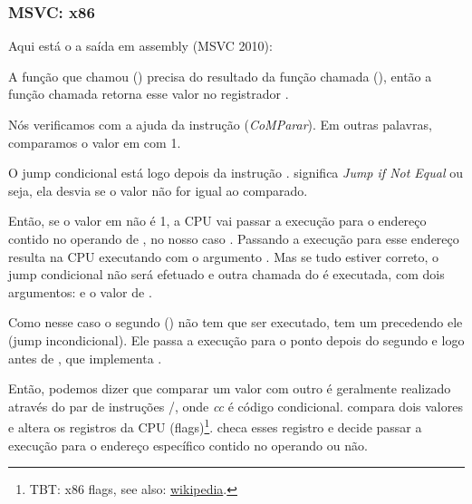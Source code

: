 \subsubsection{MSVC: x86}

Aqui está o a saída em assembly (MSVC 2010):



A função que chamou (\main) precisa do resultado da função chamada (\scanf),
então a função chamada retorna esse valor no registrador \EAX.

Nós verificamos com a ajuda da instrução  (\emph{CoMParar}). Em outras palavras, comparamos o valor em \EAX com 1.

O jump condicional \JNE está logo depois da instrução \CMP. \JNE significa \emph{Jump if Not Equal} ou seja, ela desvia se o valor não for igual ao comparado.

Então, se o valor em \EAX não é 1, a \ac{CPU} vai passar a execução para o endereço contido no operando de \JNE, no nosso caso .
Passando a execução para esse endereço resulta na \ac{CPU} executando \printf com o argumento .
Mas se tudo estiver correto, o jump condicional não será efetuado e outra chamada do \printf é executada, com dois argumentos:  e o valor de .

Como nesse caso o segundo \printf() não tem que ser executado, tem um \JMP precedendo ele (jump incondicional).
Ele passa a execução para o ponto depois do segundo \printf e logo antes de , que implementa .

Então, podemos dizer que comparar um valor com outro é geralmente realizado através do par de instruções \CMP/\Jcc, onde \emph{cc} é código condicional.
\CMP compara dois valores e altera os registros da \ac{CPU} (flags)\footnote{\ac{TBT}: x86 flags, see also: \href{http://en.wikipedia.org/wiki/FLAGS_register_(computing)}{wikipedia}.}.
\Jcc checa esses registro e decide passar a execução para o endereço específico contido no operando ou não.

